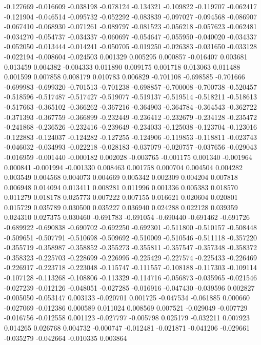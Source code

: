 -0.127669
-0.016609
-0.038198
-0.078124
-0.134321
-0.109822
-0.119707
-0.062417
-0.121904
-0.046514
-0.095732
-0.052292
-0.083839
-0.097027
-0.094568
-0.086907
-0.067410
-0.068930
-0.071261
-0.089797
-0.081523
-0.056218
-0.057623
-0.062481
-0.034270
-0.054737
-0.034337
-0.060697
-0.054647
-0.055950
-0.040020
-0.034337
-0.052050
-0.013444
-0.014241
-0.050705
-0.019250
-0.026383
-0.031650
-0.033128
-0.022194
-0.008604
-0.024503
0.001329
0.005295
0.000857
-0.016407
0.003681
0.013459
0.004382
-0.004333
0.011890
0.009175
0.001718
0.013063
0.011488
0.001599
0.007858
0.008179
0.010783
0.006829
-0.701108
-0.698585
-0.701666
-0.699983
-0.699320
-0.701513
-0.701238
-0.698857
-0.700008
-0.700738
-0.520457
-0.518596
-0.517487
-0.517427
-0.519077
-0.519137
-0.519514
-0.518211
-0.518613
-0.517663
-0.365102
-0.366262
-0.367216
-0.364903
-0.364784
-0.364543
-0.362722
-0.371393
-0.367759
-0.366899
-0.232449
-0.236412
-0.232679
-0.234128
-0.235472
-0.241868
-0.236526
-0.232416
-0.239649
-0.234033
-0.125038
-0.123704
-0.123016
-0.122883
-0.124037
-0.124282
-0.127255
-0.124906
-0.119853
-0.118811
-0.023743
-0.046032
-0.034993
-0.022218
-0.028183
-0.037079
-0.020757
-0.037656
-0.029043
-0.016959
-0.001440
-0.000182
0.002028
-0.003765
-0.001175
0.001340
-0.001964
0.000841
-0.001994
-0.001330
0.008463
0.001758
0.000704
0.004504
0.004282
0.003549
0.004568
0.004073
0.004669
0.005342
0.002309
0.004204
0.007818
0.006948
0.014094
0.013411
0.008281
0.011996
0.001336
0.005383
0.018570
0.011279
0.018178
0.025773
0.007222
0.007155
0.016621
0.020604
0.020801
0.015729
0.035789
0.030500
0.035227
0.036940
0.024288
0.022128
0.039359
0.024310
0.027375
0.030460
-0.691783
-0.691054
-0.690440
-0.691462
-0.691726
-0.689922
-0.690838
-0.690702
-0.692250
-0.692301
-0.511800
-0.510157
-0.508448
-0.509651
-0.507791
-0.510698
-0.509692
-0.510009
-0.510546
-0.511118
-0.357220
-0.355719
-0.358987
-0.358852
-0.355273
-0.355811
-0.357547
-0.357348
-0.358372
-0.358323
-0.225703
-0.228699
-0.226995
-0.225429
-0.227574
-0.225433
-0.226469
-0.226917
-0.223718
-0.223048
-0.115747
-0.111557
-0.108188
-0.117303
-0.109114
-0.107128
-0.113268
-0.108806
-0.113329
-0.114716
-0.056873
-0.035965
-0.021546
-0.027239
-0.012126
-0.048051
-0.027285
-0.016916
-0.047430
-0.039596
0.002827
-0.005050
-0.053147
0.003133
-0.020701
0.001725
-0.047534
-0.061885
0.000660
-0.027069
-0.012386
0.000589
0.011024
0.008569
0.007521
-0.029049
-0.007729
-0.016756
-0.012558
0.001123
-0.027797
-0.005798
0.025179
-0.032211
0.007923
0.014265
0.026768
0.004732
-0.000747
-0.012481
-0.021871
-0.041206
-0.029661
-0.035279
-0.042664
-0.010335
0.003864

